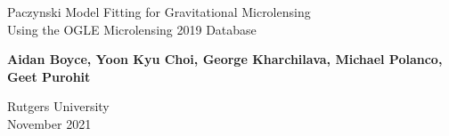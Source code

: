 \begin{titlepage}
   \begin{center}
       \vspace*{1cm}
       \Huge {Paczynski Model Fitting for Gravitational Microlensing}
       \small
       \vspace{0.5cm}
       {\\Using the OGLE Microlensing 2019 Database}

       \vspace{1.5cm}
       \normalsize
       \textbf{Aidan Boyce, Yoon Kyu Choi, George Kharchilava, Michael Polanco, Geet Purohit}


       \vfill
       \Large
       Rutgers University\\
       November 2021
            
   \end{center}
\end{titlepage}